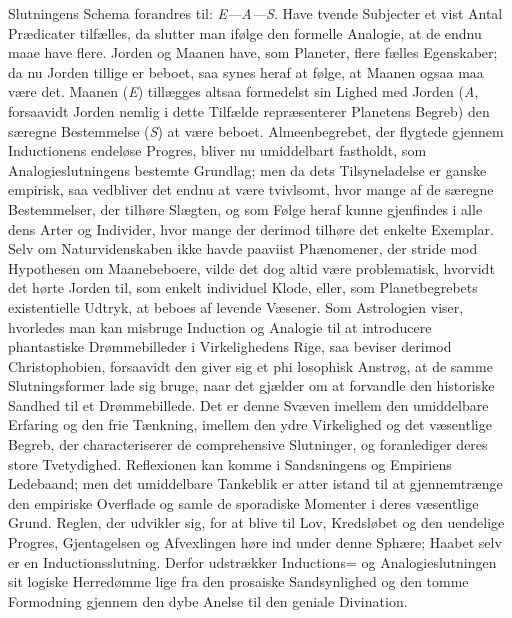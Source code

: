 \documentclass[12pt]{book}
\newcommand{\opage}[1]{\marginnote{\footnotesize\textit{[#1]}}}
\begin{document}
Slutningens Schema forandres til: \textit{E---A---S}. Have tvende Subjecter et vist
Antal Prædicater tilfælles, da slutter man ifølge den formelle Analogie, at de endnu
maae have flere. Jorden og Maanen have, som Planeter, flere fælles Egenskaber; da nu
Jorden tillige er beboet, saa synes heraf at følge, at Maanen ogsaa maa være det.
Maanen (\textit{E}) tillægges altsaa formedelst sin Lighed med Jorden (\textit{A},
forsaavidt Jorden nemlig i dette Tilfælde repræsenterer Planetens Begreb) den
særegne Bestemmelse (\textit{S}) at være beboet. Almeenbegrebet, der flygtede
gjennem Inductionens endeløse Progres, bliver nu umiddelbart fastholdt, som
Analogieslutningens bestemte Grundlag; men da dets Tilsyneladelse er ganske
empirisk, saa vedbliver det endnu at være tvivlsomt, hvor mange af de særegne
Bestemmelser, der tilhøre Slægten, og som Følge heraf kunne gjenfindes i alle dens
Arter og Individer, hvor mange der derimod tilhøre det enkelte Exemplar. Selv om
Naturvidenskaben ikke havde paaviist Phænomener, der stride mod Hypothesen om
Maanebeboere, vilde det dog altid være problematisk, hvorvidt det hørte Jorden til,
som enkelt individuel Klode, eller, som Planetbegrebets existentielle Udtryk, at
beboes af levende Væsener. Som Astrologien viser, hvorledes man kan misbruge
Induction og Analogie til at introducere phantastiske Drømmebilleder i
Virkelighedens Rige, saa beviser derimod Christophobien, forsaavidt den giver sig
et phi%
\opage{82}losophisk Anstrøg, at de samme Slutningsformer lade sig bruge, naar det gjælder om
at forvandle den historiske Sandhed til et Drømmebillede. Det er denne Svæven
imellem den umiddelbare Erfaring og den frie Tænkning, imellem den ydre Virkelighed
og det væsentlige Begreb, der characteriserer de comprehensive Slutninger, og
foranlediger deres store Tvetydighed. Reflexionen kan komme i Sandsningens og
Empiriens Ledebaand; men det umiddelbare Tankeblik er atter istand til at
gjennemtrænge den empiriske Overflade og samle de sporadiske Momenter i deres
væsentlige Grund. Reglen, der udvikler sig, for at blive til Lov, Kredsløbet og den
uendelige Progres, Gjentagelsen og Afvexlingen høre ind under denne Sphære; Haabet
selv er en Inductionsslutning. Derfor udstrækker Inductions= og
Analogieslutningen sit logiske Herredømme lige fra den prosaiske Sandsynlighed og
den tomme Formodning gjennem den dybe Anelse til den geniale Divination.
\end{document}
